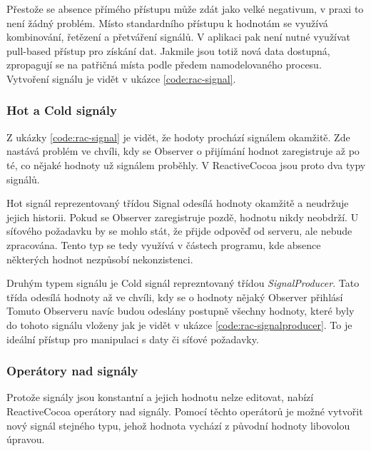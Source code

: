 Přestože se absence přímého přístupu může zdát jako velké negativum, v praxi to není žádný problém.
Místo standardního přístupu k hodnotám se využívá kombinování, řetězení a přetváření signálů.
V aplikaci pak není nutné využívat pull-based přístup pro získání dat.
Jakmile jsou totiž nová data dostupná, zpropagují se na patřičná místa podle předem namodelovaného procesu.
Vytvoření signálu je vidět v ukázce \ref{code:rac-signal}.


\subsubsection*{Hot a Cold signály}

Z ukázky \ref{code:rac-signal} je vidět, že hodoty prochází signálem okamžitě.
Zde nastává problém ve chvíli, kdy se Observer o přijímání hodnot zaregistruje až po té, co nějaké hodnoty už signálem proběhly.
V ReactiveCocoa jsou proto dva typy signálů.

Hot signál reprezentovaný třídou Signal odesílá hodnoty okamžitě a neudržuje jejich historii.
Pokud se Observer zaregistruje pozdě, hodnotu nikdy neobdrží.
U síťového požadavku by se mohlo stát, že přijde odpověď od serveru, ale nebude zpracována.
Tento typ se tedy využívá v částech programu, kde absence některých hodnot nezpůsobí nekonzistenci.

Druhým typem signálu je Cold signál reprezntovaný třídou \textit{SignalProducer}.
Tato třída odesílá hodnoty až ve chvíli, kdy se o hodnoty nějaký Observer přihlásí
Tomuto Observeru navíc budou odeslány postupně všechny hodnoty, které byly do tohoto signálu vloženy jak je vidět v ukázce \ref{code:rac-signalproducer}.
To je ideální přístup pro manipulaci s daty či síťové požadavky.


\subsubsection*{Operátory nad signály}

Protože signály jsou konstantní a jejich hodnotu nelze editovat, nabízí ReactiveCocoa operátory nad signály.
Pomocí těchto operátorů je možné vytvořit nový signál stejného typu, jehož hodnota vychází z původní hodnoty libovolou úpravou.

